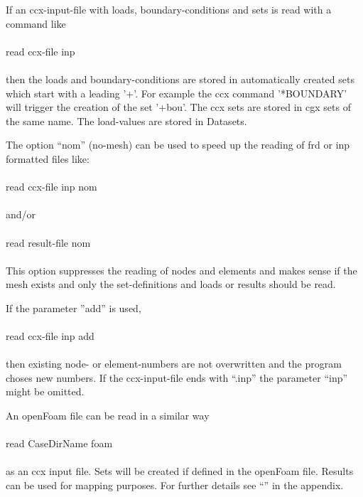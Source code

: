 \documentclass{article}
\begin{document}
If an ccx-input-file with loads, boundary-conditions and sets is read with a command like\\\\read ccx-file inp\\\\then the loads and boundary-conditions are stored in automatically created sets which start with a leading '+'. For example the ccx command '*BOUNDARY' will trigger the creation of the set '+bou'. The ccx sets are stored in cgx sets of the same name. The load-values are stored in Datasets.

The option ``nom'' (no-mesh) can be used to speed up the reading of frd or inp formatted files like:\\\\read ccx-file inp nom\\\\and/or\\\\read result-file nom\\\\This option suppresses the reading of nodes and elements and makes sense if the mesh exists and only the set-definitions and loads or results should be read. 

If the parameter ''add'' is used,\\\\read ccx-file inp add\\\\ then existing node- or element-numbers are not overwritten and the program choses new numbers. If the ccx-input-file ends with ``.inp'' the parameter ``inp'' might be omitted.

An openFoam file \cite{OpenFOAM} can be read in a similar way\\\\read CaseDirName foam\\\\as an ccx input file. Sets will be created if defined in the openFoam file. Results can be used for mapping purposes. For further details see ``'' in the appendix.
\end{document}
